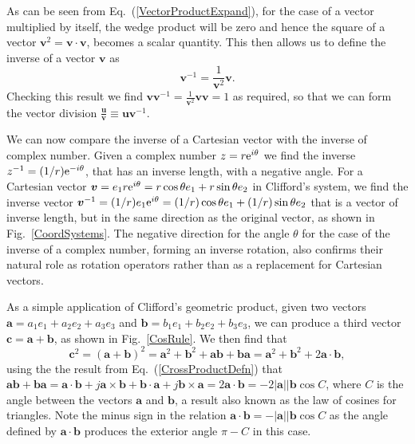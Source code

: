 \documentclass[prb,preprint]{revtex4}
\newcommand{\be}{\begin{equation}}
\newcommand{\ee}{\end{equation}}
\newcommand{\rme}{{\rm{e}}}
\newcommand{\iGAT}{{i}}
\begin{document}
As can be seen from Eq.~(\ref{VectorProductExpand}), for the case of a vector multiplied by itself, the wedge product will be zero and hence the square of a vector $ \boldsymbol{v}^2 = \boldsymbol{v} \cdot \boldsymbol{v}  $, becomes a scalar quantity.
This then allows us to define the inverse of a vector $ \boldsymbol{v} $ as 
\be \label{vectorInverse}
\boldsymbol{v}^{-1} = \frac{1}{\boldsymbol{v}^2 } \boldsymbol{v} .
\ee
Checking this result we find $ \boldsymbol{v} \boldsymbol{v}^{-1} = \frac{1}{\boldsymbol{v}^2 } \boldsymbol{v} \boldsymbol{v} = 1 $ as required, so that we can form the vector division $ \frac{\boldsymbol{u}}{\boldsymbol{v}} \equiv \boldsymbol{u} \boldsymbol{v}^{-1} $.  

We can now compare the inverse of a Cartesian vector with the inverse of complex number. Given a complex number $ z = r \rme^{\iGAT \theta } $ we find the inverse $ z^{-1} = (1/r) \rme^{- \iGAT \theta  } $, that has an inverse length, with a negative angle. For a Cartesian vector $ \boldsymbol{v} = e_1 r \rme^{ \iGAT \theta } = r \cos \theta e_1 + r \sin \theta e_2 $ in Clifford's system, we find the inverse vector $ \boldsymbol{v}^{-1} = (1/r)  e_1 \rme^{ \iGAT \theta } =  (1/r) \cos \theta e_1 + (1/r) \sin \theta e_2 $ that is a vector of inverse length, but in the same direction as the original vector, as shown in Fig.~\ref{CoordSystems}. The negative direction for the angle $ \theta $ for the case of the inverse of a complex number, forming an inverse rotation, also confirms their natural role as rotation operators rather than as a replacement for Cartesian vectors. 

As a simple application of Clifford's geometric product, given two vectors $ \boldsymbol{a} = a_1 e_1 + a_2 e_2 + a_3 e_3 $ and $ \boldsymbol{b} = b_1 e_1 + b_2 e_2 + b_3 e_3 $, we can produce a third vector $ \boldsymbol{c} = \boldsymbol{a} + \boldsymbol{b} $, as shown in Fig.~\ref{CosRule}.
We then find that
\be
\boldsymbol{c}^2 = ( \boldsymbol{a} + \boldsymbol{b})^2 = \boldsymbol{a}^2 +  \boldsymbol{b}^2 + \boldsymbol{a} \boldsymbol{b} + \boldsymbol{b} \boldsymbol{a} =  \boldsymbol{a}^2 +  \boldsymbol{b}^2 + 2 \boldsymbol{a} \cdot \boldsymbol{b}  ,
\ee
using the the result from Eq.~(\ref{CrossProductDefn}) that $ \boldsymbol{a} \boldsymbol{b} + \boldsymbol{b} \boldsymbol{a} = \boldsymbol{a} \cdot \boldsymbol{b} + j \boldsymbol{a} \times \boldsymbol{b} + \boldsymbol{b} \cdot \boldsymbol{a} + j \boldsymbol{b} \times \boldsymbol{a} = 2 \boldsymbol{a} \cdot \boldsymbol{b} = - 2 |\boldsymbol{a}| |\boldsymbol{b}  \cos C $, where $ C $ is the angle between the vectors $ \boldsymbol{a} $ and $ \boldsymbol{b} $, a result also known as the law of cosines for triangles.  Note the minus sign in the relation $ \boldsymbol{a} \cdot \boldsymbol{b} = - |\boldsymbol{a}| |\boldsymbol{b}  \cos C $ as the angle defined by $ \boldsymbol{a} \cdot \boldsymbol{b} $ produces the exterior angle $ \pi - C $ in this case.
\end{document}

